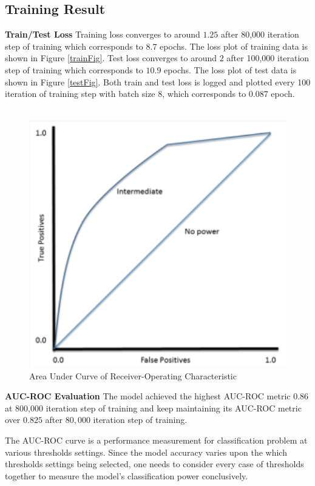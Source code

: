 \documentclass[sigconf]{acmart}
\begin{document}
\subsection{Training Result}
\textbf{Train/Test Loss} Training loss converges to around \(1.25\) after 80,000 iteration step of training which corresponds to \(8.7\) epochs. The loss plot of training data is shown in Figure \ref{trainFig}. Test loss converges to around \(2\) after 100,000 iteration step of training which corresponds to \(10.9\) epochs. The loss plot of test data is shown in Figure \ref{testFig}. Both train and test loss is logged and plotted every 100 iteration of training step with batch size \(8\), which corresponds to 0.087 epoch. \\\\
\begin{figure}
  \includegraphics[width=0.8\linewidth]{aucrocarea.png}
  \caption{Area Under Curve of Receiver-Operating Characteristic \cite{aucrocplot}}
  \label{aucrefFig}
\end{figure}\textbf{AUC-ROC Evaluation} The model achieved the highest AUC-ROC metric \(0.86\) at 800,000 iteration step of training and keep maintaining its AUC-ROC metric over \(0.825\) after \(80,000\) iteration step of training. 

The AUC-ROC curve is a performance measurement for classification problem at various thresholds settings. Since the model accuracy varies upon the which thresholds settings being selected, one needs to consider every case of thresholds together to measure the model's classification power conclusively. 
\end{document}
